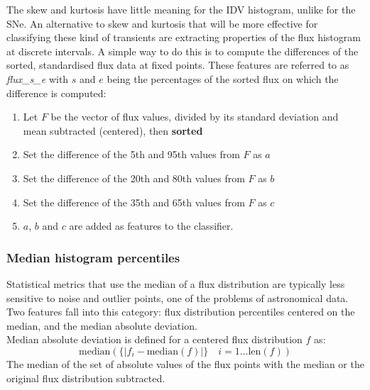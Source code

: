 	The skew and kurtosis have little meaning for the IDV histogram, unlike for the SNe. An alternative to skew and kurtosis that will be more effective for classifying these kind of transients are extracting properties of the flux histogram at discrete intervals. A simple way to do this is to compute the differences of the sorted, standardised flux data at fixed points. These features are referred to as \emph{flux\_s\_e} with $s$ and $e$ being the percentages of the sorted flux on which the difference is computed:
	
	\begin{enumerate}
		\item Let $F$ be the vector of flux values, divided by its standard deviation and mean subtracted (centered), then \textbf{sorted}
		\item Set the difference of the 5th and 95th values from $F$ as $a$
		\item Set the difference of the 20th and 80th values from $F$ as $b$
		\item Set the difference of the 35th and 65th values from $F$ as $c$
		\item $a$, $b$ and $c$ are added as features to the classifier.
	\end{enumerate}

	
	\subsubsection{Median histogram percentiles}
	Statistical metrics that use the median of a flux distribution are typically less sensitive to noise and outlier points, one of the problems of astronomical data. Two features fall into this category: flux distribution percentiles centered on the median, and the median absolute deviation.  \\

	Median absolute deviation is defined for a centered flux distribution $f$ as:
	\begin{equation}
		\mbox{median}(\{|f_{i} - \mbox{median}(f)|\} \quad i=1\ldots\mbox{len}(f))
	\end{equation}
	The median of the set of absolute values of the flux points with the median or the original flux distribution subtracted. \\
	
